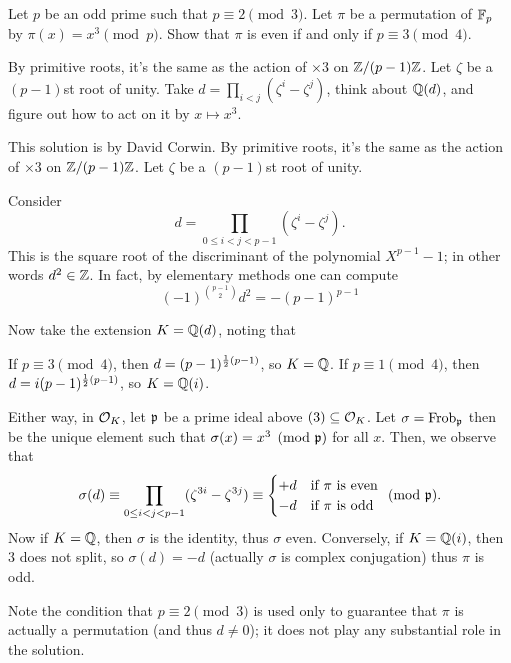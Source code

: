 \begin{problem}
	[Putnam 2012 B6]
	\yod
	Let $p$ be an odd prime such that $p \equiv 2 \pmod 3$.
	Let $\pi$ be a permutation of $\mathbb F_p$ by $\pi(x) = x^3 \pmod p$.
	Show that $\pi$ is even if and only if $p \equiv 3 \pmod 4$.
	\begin{hint}
		By primitive roots, it's the same as the action of $\times 3$ on $\mathbb Z/(p-1)\mathbb Z$.
		Let $\zeta$ be a $(p-1)$st root of unity.
		Take $d = \prod_{i < j} (\zeta^i - \zeta^j)$, think about $\mathbb Q(d)$,
		and figure out how to act on it by $x \mapsto x^3$.
	\end{hint}
	\begin{sol}
		This solution is by David Corwin.
		By primitive roots, it's the same as the action of $\times 3$ on $\mathbb Z/(p-1)\mathbb Z$.
		Let $\zeta$ be a $(p-1)$st root of unity.

		Consider 
		\[ d = \prod_{0 \le i < j < p-1} (\zeta^i - \zeta^j). \]
		This is the square root of the discriminant of 
		the polynomial $X^{p-1}-1$; in other words $d^2 \in \mathbb Z$.
		In fact, by elementary methods one can compute
		\[ (-1)^{\binom{p-1}{2}} d^2 = -(p-1)^{p-1} \]

		Now take the extension $K = \mathbb Q(d)$, noting that
		\begin{itemize}
			\ii If $p \equiv 3 \pmod 4$, then $d = (p-1)^{\frac{1}{2}(p-1)}$, so $K = \mathbb Q$.
			\ii If $p \equiv 1 \pmod 4$, then $d = i(p-1)^{\frac{1}{2}(p-1)}$, so $K = \mathbb Q(i)$.
		\end{itemize}
		Either way, in $\mathcal O_K$, let $\mathfrak p$ be a prime ideal above $(3) \subseteq \mathcal O_K$.
		Let $\sigma = \mathrm{Frob}_\mathfrak p$ then be the unique element such that
		$\sigma(x) = x^3 \pmod{\mathfrak p}$ for all $x$.
		Then, we observe that
		\[
			\sigma(d) \equiv \prod_{0 \le i < j < p-1} (\zeta^{3i} - \zeta^{3j})
			\equiv \begin{cases}
				+d & \text{if $\pi$ is even} \\
				-d & \text{if $\pi$ is odd}
			\end{cases} \pmod{\mathfrak p}.
		\]
		Now if $K = \mathbb Q$, then $\sigma$ is the identity, thus $\sigma$ even.
		Conversely, if $K = \mathbb Q(i)$, then $3$ does not split, so $\sigma(d) = -d$
		(actually $\sigma$ is complex conjugation) thus $\pi$ is odd.

		Note the condition that $p \equiv 2 \pmod 3$ is used only
		to guarantee that $\pi$ is actually a permutation (and thus $d \neq 0$);
		it does not play any substantial role in the solution.
	\end{sol}
\end{problem}
